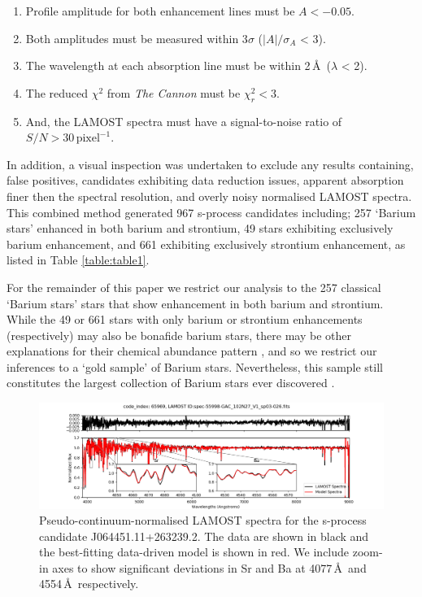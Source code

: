 \documentclass[a4paper,fleqn,usenatbib]{mnras}
\begin{document}
\renewcommand\labelenumi{(\roman{enumi})}
\renewcommand\theenumi\labelenumi

\begin{enumerate} 
\item Profile amplitude for both enhancement lines must be $A < -0.05$.
\item Both amplitudes must be measured within 3$\sigma$ ($|A|/\sigma _A$ < 3).
\item The wavelength at each absorption line must be within 2\,\AA\ ($\lambda$ < 2).
\item The reduced $\chi^2$ from \emph{The Cannon} must be $\chi_r^2 < 3$.
\item And, the LAMOST spectra must have a signal-to-noise ratio of $S/N > 30\,\textrm{pixel}^{-1}$.
\end{enumerate}
In addition, a visual inspection was undertaken to exclude any results containing, false positives, candidates exhibiting data reduction issues, apparent absorption finer then the spectral resolution, and overly noisy normalised LAMOST spectra. This combined method generated 967 s-process candidates including; 257 `Barium stars' enhanced in both barium and strontium, 49 stars exhibiting exclusively barium enhancement, and 661 exhibiting exclusively strontium enhancement, as listed in Table \ref{table:table1}. 

For the remainder of this paper we restrict our analysis to the 257 classical `Barium stars' stars that show enhancement in both barium and strontium. While the 49 or 661 stars with only barium or strontium enhancements (respectively) may also be bonafide barium stars, there may be other explanations for their chemical abundance pattern \citep[e.g.,][]{maiorca2011}, and so we restrict our inferences to a `gold sample' of Barium stars. Nevertheless, this sample still constitutes the largest collection of Barium stars ever discovered \citep[e.g.,][]{decastro2016}.


\begin{figure}
	\includegraphics[width=\textwidth]{posterchild.png}
    \caption{Pseudo-continuum-normalised LAMOST spectra for the s-process candidate J064451.11+263239.2. The data are shown in black and the best-fitting data-driven model is shown in red. We include zoom-in axes to show significant deviations in Sr and Ba at  4077\,\AA\ and 4554\,\AA\, respectively.}
    \label{fig:figure1}
\end{figure}
\end{document}
